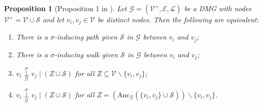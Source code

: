 \documentclass[accepted]{uai2025} %
\newtheorem{proposition}{Proposition}
\newcommand{\anc}{\text{Anc}}
\begin{document}
\begin{proposition}[Proposition 1 in \citep{mooij2020constraint}] \label{proposition12.2.3}
Let $\mathcal{G}=(\mathcal{V}^+,\mathcal{E},\mathcal{L})$ be a DMG with nodes $\mathcal{V}^+=\mathcal{V}\cup\mathcal{S}$ and let $v_i,v_j\in\mathcal{V}$ be distinct nodes. Then the following are equivalent:
\begin{enumerate}
    \item There is a $\sigma$-inducing path given $\mathcal{S}$ in $\mathcal{G}$ between $v_i$ and $v_j$;
    \item There is a $\sigma$-inducing walk given $\mathcal{S}$ in $\mathcal{G}$ between $v_i$ and $v_j$;
    \item $v_i\overset{\sigma}{\underset{\mathcal{G}}{\perp}} v_j\mid (Z\cup\mathcal{S})$ for all $Z\subseteq\mathcal{V}\backslash\{v_i,v_j\}$;
    \item $v_i\overset{\sigma}{\underset{\mathcal{G}}{\perp}} v_j\mid (Z\cup\mathcal{S})$ for all $Z=(\anc_\mathcal{G}(\{v_i,v_j\}\cup\mathcal{S}))\backslash\{v_i,v_j\}$.
\end{enumerate}
\end{proposition}
\end{document}
